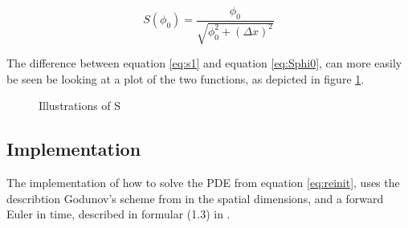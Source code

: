\begin{equation}
\label{eq:Sphi0}
S(\phi_0) = \frac{\phi_0}{\sqrt{\phi_0^2 + (\Delta x)^2}}
\end{equation}

The difference between equation \eqref{eq:s1} and equation
\eqref{eq:Sphi0}, can more easily be seen be looking at a plot of the
two functions, as depicted in figure \ref{fig:s-graph}.

\begin{figure}[h]
\begin{center}
\end{center}
\caption{Illustrations of S}
\label{fig:s-graph}
\end{figure}



\pagebreak
\subsection{Implementation}
The implementation of how to solve the PDE from equation \eqref{eq:reinit},
uses the describtion Godunov's scheme from 
in the spatial dimensions, and a forward Euler in time, described in
formular (1.3) in .


